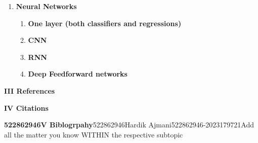 \documentclass{article} %
\begin{document}
\begin{enumerate}
\begin{enumerate}
\item \textbf{ Neural Networks}

\begin{enumerate}
\item \textbf{ One layer (both classifiers and regressions)}

\item \textbf{ CNN}

\item \textbf{ RNN}

\item \textbf{ Deep Feedforward networks}
\end{enumerate}
\end{enumerate}
\end{enumerate}

\noindent \textbf{III References}

\noindent \textbf{IV Citations}

\noindent \textbf{522862946V Biblogrpahy}522862946Hardik Ajmani522862946-2023179721Add all the matter you know WITHIN the respective subtopic\textbf{}

\textbf{}







\noindent 
\end{document}
